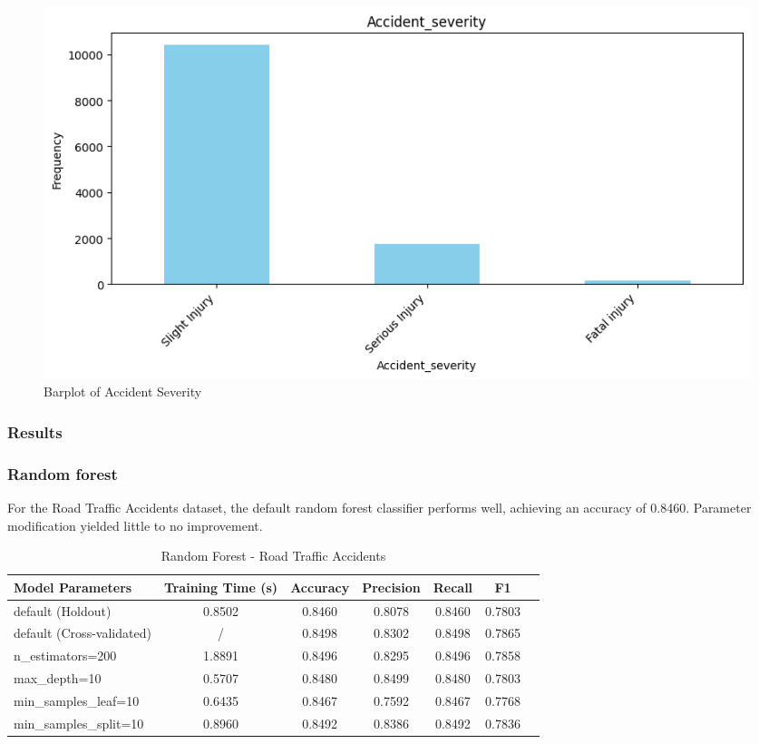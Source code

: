 \documentclass{article}
\begin{document}
\begin{figure}[H]
\centering
\includegraphics[width=1\linewidth]{Accident_severity.png}
\caption{\label{fig:bar:severity} Barplot of Accident Severity}
\end{figure}



\subsubsection{Results}
\subsubsection*{Random forest}
For the Road Traffic Accidents dataset, the default random forest classifier performs well, achieving an accuracy of 0.8460. Parameter modification yielded little to no improvement.
\begin{table}[ht]
\centering
\begin{tabular}{l|c|c|c|c|c|c}
\textbf{Model Parameters} & \textbf{Training Time (s)} & \textbf{Accuracy} & \textbf{Precision} & \textbf{Recall} & \textbf{F1} \\\hline
default (Holdout) & 0.8502  & 0.8460 & 0.8078 & 0.8460 & 0.7803 \\
default (Cross-validated) & /  & 0.8498 & 0.8302 & 0.8498 & 0.7865 \\
n\_estimators=200 & 1.8891  & 0.8496 & 0.8295 & 0.8496  & 0.7858 \\
max\_depth=10 & 0.5707  & 0.8480 & 0.8499 & 0.8480 & 0.7803 \\
min\_samples\_leaf=10 & 0.6435  & 0.8467  & 0.7592 & 0.8467 & 0.7768 \\
min\_samples\_split=10 & 0.8960  & 0.8492 & 0.8386 & 0.8492 & 0.7836 \\
\end{tabular}
\caption{Random Forest - Road Traffic Accidents}
\label{tab:Random Forest - Road Traffic Accidents}
\end{table}
\end{document}
